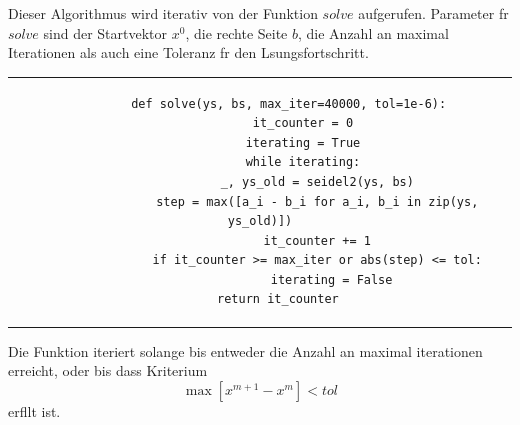 \documentclass[12pt,titlepage]{article}
\begin{document}
		Dieser Algorithmus wird iterativ von der Funktion $solve$ aufgerufen. Parameter fr $solve$ sind der Startvektor
		$x^0$, die rechte Seite $b$, die Anzahl an maximal Iterationen als auch eine Toleranz fr den Lsungsfortschritt.
		\newline \newline
		\begin{tabular}{c}
		\begin{lstlisting}
		def solve(ys, bs, max_iter=40000, tol=1e-6):
    		it_counter = 0
    		iterating = True
   	 		while iterating:
        		_, ys_old = seidel2(ys, bs)
        		step = max([a_i - b_i for a_i, b_i in zip(ys, ys_old)])
        		it_counter += 1
        		if it_counter >= max_iter or abs(step) <= tol:
            		iterating = False
    		return it_counter		
	 	\end{lstlisting}
		\end{tabular}
		\newline \newline
		Die Funktion iteriert solange bis entweder die Anzahl an maximal iterationen erreicht, oder bis dass Kriterium
		\begin{equation*}
			\max [x^{m+1}-x^{m}] < tol
		\end{equation*}
		erfllt ist.
		
\end{document}
